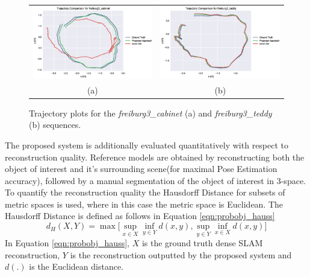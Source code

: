\begin{figure}[ht]
  \label{fig:probobj_traj}
  \centering
  \begin{tabular}{cc}
  \includegraphics[width=.5\linewidth]{figures/object_recon/plots/traj/cab_traj.eps} & 
  \includegraphics[width=.5\linewidth]{figures/object_recon/plots/traj/ted_traj.eps} \\
  (a) & (b)
  \end{tabular}
  \caption{Trajectory plots for the \textit{freiburg3\_cabinet} (a) 
  and \textit{\textsf{freiburg3\_teddy}} (b) sequences.}
\end{figure}

The proposed system is additionally evaluated quantitatively with respect to reconstruction 
quality. Reference models are obtained by reconstructing both the object of interest and it's 
surrounding scene(for maximal Pose Estimation accuracy), followed by a manual segmentation of 
the object of interest in 3-space. To quantify the reconstruction quality the Hausdorff 
Distance \cite{Hausdorff} for subsets of metric spaces is used, where in this case the metric 
space is Euclidean. The Hausdorff Distance is defined as follows in Equation \ref{eqn:probobj_hauss}
\begin{equation}
  \label{eqn:probobj_hauss}
  d_{H}(X, Y) = \max \Bigg[
  \sup_{x \in X} \inf_{y \in Y} d(x, y), \sup_{y \in Y} \inf_{x \in X} d(x, y) 
  \Bigg]
\end{equation}
In Equation \ref{eqn:probobj_hauss}, $X$ is the ground truth dense SLAM reconstruction, 
$Y$ is the reconstruction outputted by the proposed system and $d(.)$ is the Euclidean 
distance.

